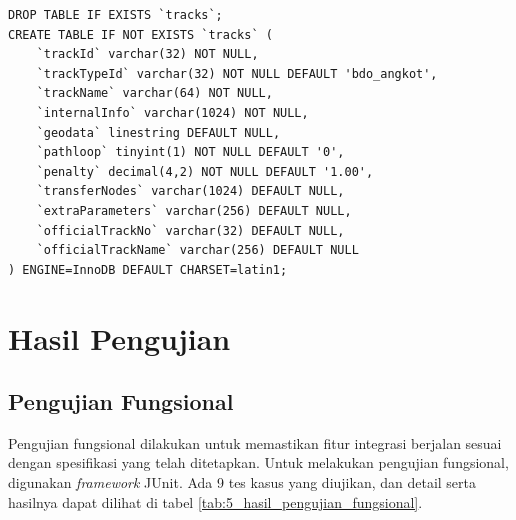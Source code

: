 \begin{lstlisting}
DROP TABLE IF EXISTS `tracks`;
CREATE TABLE IF NOT EXISTS `tracks` (
	`trackId` varchar(32) NOT NULL,
	`trackTypeId` varchar(32) NOT NULL DEFAULT 'bdo_angkot',
	`trackName` varchar(64) NOT NULL,
	`internalInfo` varchar(1024) NOT NULL,
	`geodata` linestring DEFAULT NULL,
	`pathloop` tinyint(1) NOT NULL DEFAULT '0',
	`penalty` decimal(4,2) NOT NULL DEFAULT '1.00',
	`transferNodes` varchar(1024) DEFAULT NULL,
	`extraParameters` varchar(256) DEFAULT NULL,
	`officialTrackNo` varchar(32) DEFAULT NULL,
	`officialTrackName` varchar(256) DEFAULT NULL
) ENGINE=InnoDB DEFAULT CHARSET=latin1;
\end{lstlisting}

\section{Hasil Pengujian}

\subsection{Pengujian Fungsional}

Pengujian fungsional dilakukan untuk memastikan fitur integrasi berjalan sesuai dengan spesifikasi yang telah ditetapkan. Untuk melakukan pengujian fungsional, digunakan \textit{framework} JUnit\cite{junit}. Ada 9 tes kasus yang diujikan, dan detail serta hasilnya dapat dilihat di tabel \ref{tab:5_hasil_pengujian_fungsional}.

